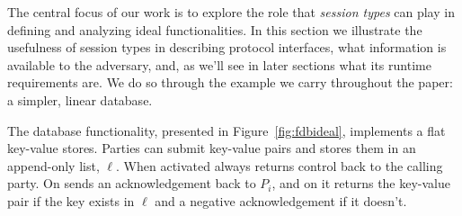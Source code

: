 
The central focus of our work is to explore the role that \emph{session types} can play in defining and analyzing ideal functionalities.
In this section we illustrate the usefulness of session types in describing protocol interfaces, what information  is available to the adversary, and, as we'll see in later sections
what its runtime requirements are. 
We do so through the example we carry throughout the paper: a simpler, linear database.

The database functionality, presented in Figure~\ref{fig:fdbideal}, implements a flat key-value stores.
Parties can submit key-value pairs and \Fdb stores them in an append-only list, $\ell$.
When activated  \Fdb always returns control back to the calling party. 
On  \Fdb sends an acknowledgement back to $P_i$, and on  it returns the key-value pair if the key exists in $\ell$ and a negative acknowledgement if it doesn't.

